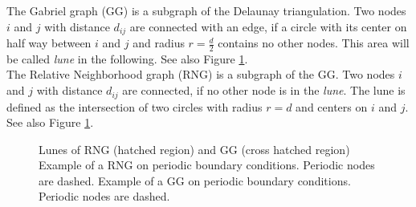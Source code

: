     The Gabriel graph (GG) \cite{Gabriel1969} is a subgraph of the
    Delaunay triangulation. Two nodes \(i\) and \(j\) with distance
    \(d_{ij}\) are connected with an edge, if a circle with its
    center on half way between \(i\) and \(j\) and radius
    \(r = \frac d 2\) contains no other nodes. This area will be
    called \emph{lune} in the following. See also Figure
    \ref{fig:lunes}.\\
    The Relative Neighborhood graph (RNG) \cite{Toussaint1980} is a
    subgraph of the GG. Two nodes \(i\) and \(j\) with
    distance \(d_{ij}\) are connected, if no other node is in the
    \emph{lune}. The lune is defined as the intersection of two
    circles with radius \(r = d\) and centers on \(i\) and \(j\).
    See also Figure \ref{fig:lunes}.
    \begin{figure}[htbp]
        \centering
        \caption[Gabriel - and Relative Neighborhood Graph]
        {
             Lunes of RNG (hatched region) and
                GG (cross hatched region)
             Example of a RNG on periodic
                boundary conditions. Periodic nodes are dashed.
             Example of a GG on
                periodic boundary conditions. Periodic nodes are dashed.
        }
        \label{fig:lunes}
    \end{figure}\\
